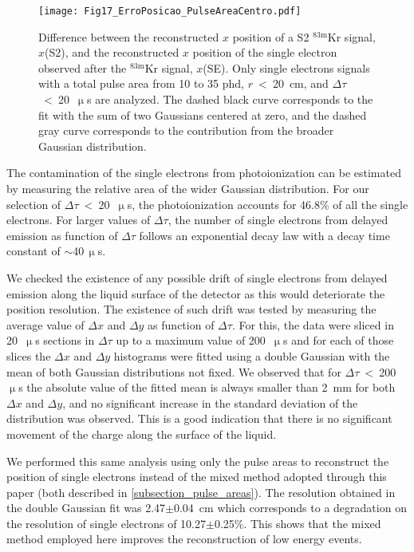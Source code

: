 \documentclass[a4paper,11pt]{article}
\begin{document}
\begin{figure}
 \begin{center}
  \texttt{[image: Fig17\_ErroPosicao\_PulseAreaCentro.pdf]}
  \caption{Difference between the reconstructed $x$ position of a S2 ${}^{\mathrm{83m}}$Kr signal, $x$(S2), and the reconstructed $x$ position of the single electron observed after the ${}^{\mathrm{83m}}$Kr signal, $x$(SE). Only single electrons signals with a total pulse area from 10 to 35 phd, $r$~<~20~cm, and $\Delta\tau$~<~20~$\upmu$s are analyzed. The dashed black curve corresponds to the fit with the sum of two Gaussians centered at zero, and the dashed gray curve corresponds to the contribution from the broader Gaussian distribution.}
  \label{Fig29_ErroPosicao_PulseAreaCentro}
 \end{center}
\end{figure}

The contamination of the single electrons from photoionization can be estimated by measuring the relative area of the wider Gaussian distribution. For our selection of $\Delta\tau$~<~20~$\upmu$s, the photoionization accounts for 46.8\% of all the single electrons. For larger values of $\Delta\tau$, the number of single electrons from delayed emission as function of $\Delta\tau$ follows an exponential decay law with a decay time constant of $\sim$40\,$\upmu$s.  

We checked the existence of any possible drift of single electrons from delayed emission along the liquid surface of the detector as this would deteriorate the position resolution. The existence of such drift was tested by measuring the average value of $\Delta x$ and $\Delta y$ as function of $\Delta\tau$. For this, the data were sliced in 20~$\upmu$s sections in $\Delta\tau$ up to a maximum value of 200~$\upmu$s and for each of those slices the $\Delta x$ and $\Delta y$ histograms were fitted  using a double Gaussian  with the mean of both Gaussian distributions not fixed. We observed that for $\Delta\tau$~<~200~$\upmu$s the absolute value of the fitted mean is always smaller than 2~mm for both $\Delta x$ and $\Delta y$, and no significant increase in the standard deviation of the distribution was observed. This is a good indication that there is no significant movement of the charge along the surface of the liquid.

We performed this same analysis using only the pulse areas to reconstruct the position of single electrons instead of the mixed method adopted through this paper (both described in \cref{subsection_pulse_areas}). The resolution obtained in the double Gaussian fit was 2.47$\pm$0.04~cm which corresponds to a degradation on the resolution of single electrons of 10.27$\pm$0.25\%.  This shows that the mixed method employed here improves the reconstruction of low energy events.
\end{document}

